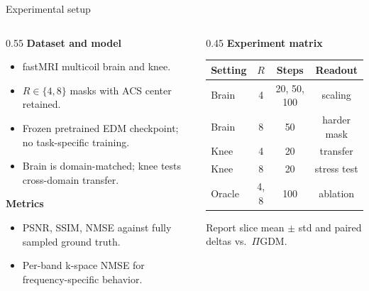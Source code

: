 \documentclass[aspectratio=169]{beamer}
\newcommand{\PIGDM}{$\Pi$GDM}
\begin{document}
\begin{frame}{Experimental setup}
  \footnotesize
  \begin{columns}[T]
    \begin{column}{0.55\textwidth}
      \textbf{Dataset and model}
      \begin{itemize}
        \item fastMRI multicoil brain and knee.
        \item $R\in\{4,8\}$ masks with ACS center retained.
        \item Frozen pretrained EDM checkpoint; no task-specific training.
        \item Brain is domain-matched; knee tests cross-domain transfer.
      \end{itemize}
      \vspace{0.4em}
      \textbf{Metrics}
      \begin{itemize}
        \item PSNR, SSIM, NMSE against fully sampled ground truth.
        \item Per-band k-space NMSE for frequency-specific behavior.
      \end{itemize}
    \end{column}
    \begin{column}{0.45\textwidth}
      \textbf{Experiment matrix}
      \begin{center}
      \scriptsize
      \begin{tabular}{@{}l c c c@{}}
        \toprule
        Setting & $R$ & Steps & Readout \\
        \midrule
        Brain & 4 & 20, 50, 100 & scaling \\
        Brain & 8 & 50 & harder mask \\
        Knee & 4 & 20 & transfer \\
        Knee & 8 & 20 & stress test \\
        Oracle & 4, 8 & 100 & ablation \\
        \bottomrule
      \end{tabular}
      \end{center}
      \vspace{0.2em}
      \footnotesize
      Report slice mean $\pm$ std and paired deltas vs.\ \PIGDM{}.
    \end{column}
  \end{columns}
\end{frame}
\end{document}
